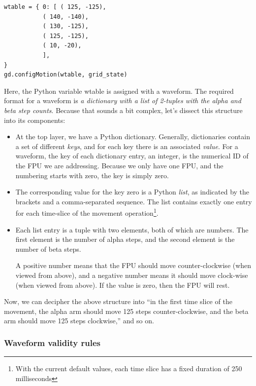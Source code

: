 \documentclass[11pt,a4paper]{scrartcl}
\begin{document}
\begin{verbatim}
wtable = { 0: [ ( 125, -125),
           ( 140, -140),
           ( 130, -125),
           ( 125, -125),
           ( 10, -20),
           ],
}
gd.configMotion(wtable, grid_state)
\end{verbatim}

Here, the Python variable wtable is assigned with
a waveform. The required format for a waveform
is \emph{a dictionary with a list of 2-tuples
  with the alpha and beta step counts}. Because
that sounds a bit complex, let's dissect this
structure into its components:

\begin{itemize}
  
\item At the top layer, we have a Python dictionary. Generally,
  dictionaries contain a set of different \emph{keys}, and for each
  key there is an associated \emph{value}. For a waveform, the key of
  each dictionary entry, an integer, is the numerical ID of the FPU we
  are addressing.  Because we only have one FPU, and the numbering
  starts with zero, the key is simply zero.

\item The corresponding value for the key zero is a Python
  \emph{list}, as indicated by the brackets and a comma-separated
  sequence. The list contains exactly one entry for each time-slice of
  the movement operation\footnote{With the current default values,
    each time slice has a fixed duration of 250 milliseconds}.

\item Each list entry is a tuple with two elements, both of which are
  numbers. The first element is the number of alpha steps, and the
  second element is the number of beta steps.

  A positive number means that the FPU should move counter-clockwise
  (when viewed from above), and a negative number means it should move
  clock-wise (when viewed from above). If the value is zero, then the
  FPU will rest.

\end{itemize}

Now, we can decipher the above structure into ``in the first time
slice of the movement, the alpha arm should move 125 steps
counter-clockwise, and the beta arm should move 125 steps
clockwise,'' and so on.

\subsubsection{Waveform validity rules}
\label{sec:validity_rulesets}
\end{document}
